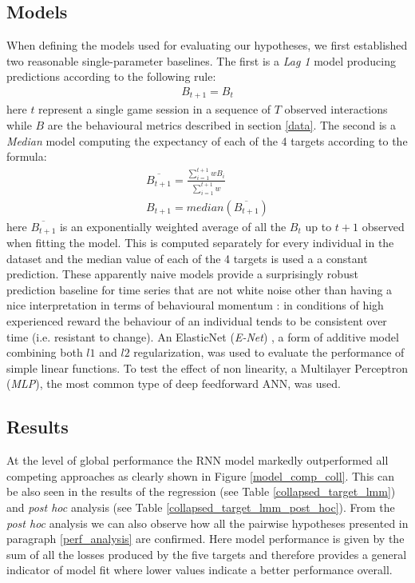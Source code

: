 \subsection{Models} 
\label{models}
When defining the models used for evaluating our hypotheses, we first established two reasonable single-parameter baselines. The first is a \textit{Lag 1} model producing predictions according to the following rule:
\begin{equation}
   \begin{gathered}  
     B_{t+1} = B_{t}
     \label{lag_1}
  \end{gathered}
\end{equation}
here $t$ represent a single game session in a sequence of $T$ observed interactions while $B$ are the behavioural metrics described in section \ref{data}. The second is a \textit{Median} model computing the expectancy of each of the 4 targets according to the formula:
\begin{equation}
  \begin{gathered}  
    \overline{B_{t+1}} = \frac
      {\sum_{i=1}^{t+1} wB_{i}}
      {\sum_{i=1}^{t+1} w }\\
    B_{t+1} = median(\overline{B_{t+1}}) 
    \label{median}
  \end{gathered}
\end{equation}
here $\overline{B_{t+1}}$ is an exponentially weighted average of all the $B_t$ up to $t+1$ observed when fitting the model. This is computed separately for every individual in the dataset and the median value of each of the 4 targets is used a a constant prediction. These apparently naive models provide a surprisingly robust prediction baseline for time series that are not white noise \cite{hyndman2018forecasting} other than having a nice interpretation in terms of behavioural momentum \cite{nevin2000behavioral}: in conditions of high experienced reward the behaviour of an individual tends to be consistent over time (i.e. resistant to change). An ElasticNet (\textit{E-Net}) \cite{zou2005regularization}, a form of additive model combining both $l1$ and $l2$ regularization, was used to evaluate the performance of simple linear functions. To test the effect of non linearity, a Multilayer Perceptron (\textit{MLP}), the most common type of deep feedforward ANN, was used. 

\subsection{Results}
At the level of global performance the RNN model markedly outperformed all competing approaches as clearly shown in Figure \ref{model_comp_coll}. This can be also seen in the results of the regression (see Table \ref{collapsed_target_lmm}) and  \textit{post hoc} analysis (see Table \ref{collapsed_target_lmm_post_hoc}). From the \textit{post hoc} analysis we can also observe how all the pairwise hypotheses presented in paragraph \ref{perf_analysis} are confirmed. Here model performance is given by the sum of all the losses produced by the five targets and therefore provides a general indicator of model fit where lower values indicate a better performance overall.

